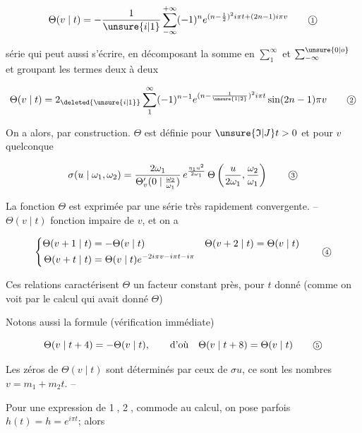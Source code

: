 \[
\Theta(v\mid t)=-\frac{1}{\unsure{i|1}}\sum_{-\infty}^{+\infty}(-1)^n e^{(n-\frac12)^2i\pi t+(2n-1)i\pi v}
\tag*{\textcircled{\scriptsize 1}}
\]

série qui peut aussi s'écrire, en  décomposant la somme en $\sum_1^\infty$ et $\sum_{-\infty}^{\unsure{0|o}}$ et groupant les termes deux à deux

\[
\Theta(v\mid t)=2_{\deleted{\unsure{i|1}}}\sum_1^\infty(-1)^{n-1}e^{(n-\frac{1}{\unsure{1|2}})^2i\pi t}\sin(2n-1)\pi v
\tag*{\textcircled{\scriptsize 2}}
\]

On a alors, par construction. $\Theta$ est définie  pour $\unsure{\mathfrak I|J}t>0$ et pour $v$ quelconque

\[
\sigma(u\mid\omega_1,\omega_2)=
\frac{2\omega_1}{\Theta'_v(0\mid\frac{\omega_2}{\omega_1})}\,
e^{\frac{\eta_1u^2}{2\omega_1}}\,\Theta\left(\frac{u}{2\omega_1},\frac{\omega_2}{\omega_1}\right)
\tag*{\textcircled{\scriptsize 3}}
\]

La fonction $\Theta$ est exprimée par une série très rapidement convergente. -- $\Theta(v\mid t)$  fonction impaire de $v$, et on a

\[
\left\{\begin{aligned}
\Theta(v+1\mid t)&=-\Theta(v\mid t)&\Theta(v+2\mid t)&=\Theta(v\mid t)\\
\Theta(v+t\mid t)&=\Theta(v\mid t)e^{-2i\pi v-i\pi t-i\pi}
\end{aligned}\right.
\tag*{\textcircled{\scriptsize 4}}
\]

Ces relations caractérisent $\Theta$  un facteur constant près, pour $t$ donné (comme on voit par le calcul qui avait donné $\Theta$)

Notons aussi la formule (vérification immédiate)

\[
\Theta(v\mid t+4)=-\Theta(v\mid t),\qquad\text{d'où}\quad\Theta(v\mid t+8)=\Theta(v\mid t)
\tag*{\textcircled{\scriptsize 5}}
\]

Les zéros de $\Theta(v\mid t)$ sont déterminés par ceux de $\sigma u$, ce sont les nombres $v=m_1+m_2 t$. --

Pour une expression de \textcircled{\scriptsize 1}, \textcircled{\scriptsize 2}, commode au calcul, on pose parfois $h(t)=h=e^{i\pi t}$; alors

